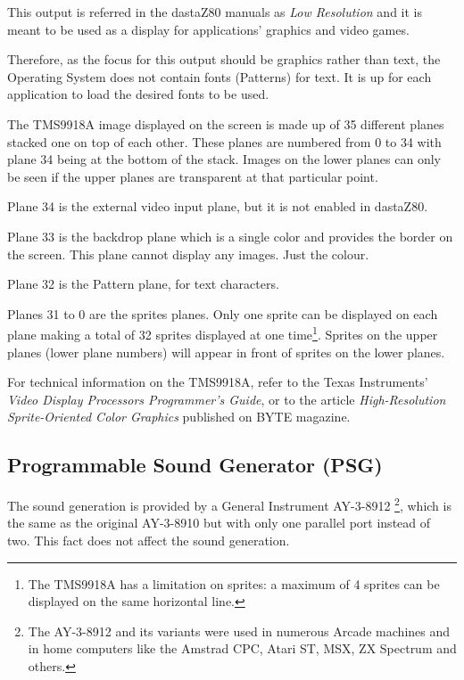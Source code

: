 \documentclass[a4paper,11pt]{article}
\begin{document}
    This output is referred in the dastaZ80 manuals as \textit{Low Resolution}
    and it is meant to be used as a display for applications' graphics and video
    games.

    Therefore, as the focus for this output should be graphics rather than text,
    the Operating System does not contain fonts (Patterns) for text. It is up
    for each application to load the desired fonts to be used.

    The TMS9918A image displayed on the screen is made up of 35 different planes
    stacked one on top of each other. These planes are numbered from 0 to 34
    with plane 34 being at the bottom of the stack. Images on the lower planes
    can only be seen if the upper planes are transparent at that particular
    point.

    Plane 34 is the external video input plane, but it is not enabled in dastaZ80.

    Plane 33 is the backdrop plane which is a single color and provides the
    border on the screen. This plane cannot display any images. Just the colour.

    Plane 32 is the Pattern plane, for text characters.

    Planes 31 to 0 are the sprites planes. Only one sprite can be displayed on
    each plane making a total of 32 sprites displayed at one time\footnote{The 
    TMS9918A has a limitation on sprites: a maximum of 4 sprites can be
    displayed on the same horizontal line.}. Sprites on the upper planes (lower
    plane numbers) will appear in front of sprites on the lower planes.

    For technical information on the TMS9918A, refer to the Texas Instruments'
    \textit{Video Display Processors Programmer's Guide}\cite{ti1}, or to the article
    \textit{High-Resolution Sprite-Oriented Color Graphics}\cite{ciarcia2}
    published on BYTE magazine.

    \subsection{Programmable Sound Generator (PSG)}

    The sound generation is provided by a General Instrument AY-3-8912
    \footnote{The AY-3-8912 and its variants were used in numerous Arcade
    machines and in home computers like the Amstrad CPC, Atari ST, MSX, ZX
    Spectrum and others.}, which is the same as the original AY-3-8910 but with
    only one parallel port instead of two. This fact does not affect the
    sound generation.
\end{document}
